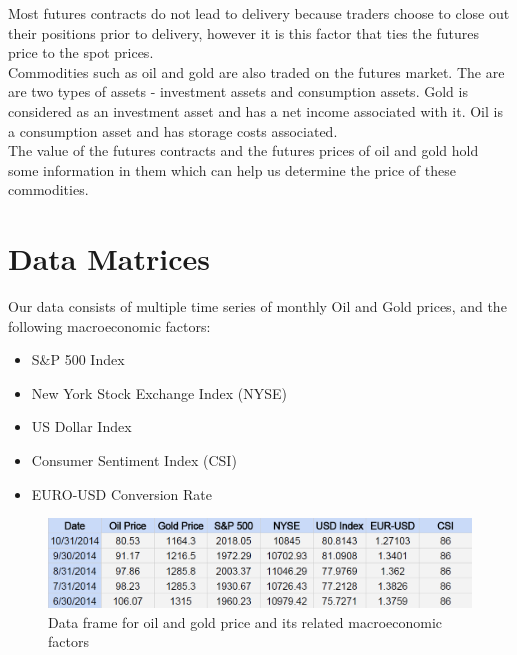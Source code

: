 \documentclass[runningheads]{llncs}
\begin{document}
\noindent Most futures contracts do not lead to delivery because traders choose to close out their positions prior to delivery, however it is this factor that ties the futures price to the spot prices. \\

\noindent Commodities such as oil and gold are also traded on the futures market. The are are two types of assets - investment assets and consumption assets. Gold is considered as an investment asset and has a net income associated with it. Oil is a consumption asset and has storage costs associated.\\

\noindent The value of the futures contracts and the futures prices of oil and gold hold some information in them which can help us determine the price of these commodities.  

\newpage
\section{Data Matrices}
Our data consists of multiple time series of monthly Oil and Gold prices\cite{quandal}, and the following macroeconomic factors:

\begin {itemize}
\item S\&P 500 Index \cite{quandal}
\item New York Stock Exchange Index (NYSE) \cite{quandal}
\item US Dollar Index \cite{quandal}
\item Consumer Sentiment Index (CSI) \cite{csi}
\item EURO-USD Conversion Rate \cite{quandal}
\end {itemize}
 
\begin{figure}
\centering
\includegraphics[width=\textwidth]{DataMatrices.png}
\caption{Data frame for oil and gold price and its related macroeconomic factors}
\label{fig:DataMatrices.png}
\end{figure}
\end{document}
